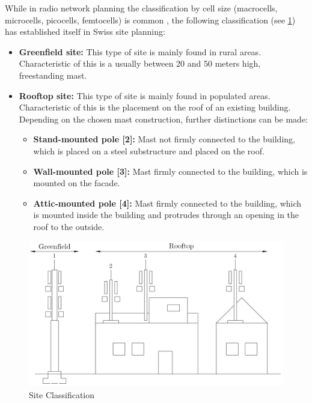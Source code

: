 \begin{English}
    While in radio network planning the classification by cell size (macrocells, microcells, picocells, femtocells) is common \cite{jiangCellularCommunicationNetworks2024}, the following classification (see \ref{fig:site_classification}) has established itself in Swiss site planning:

    \begin{itemize}
        \item \textbf{Greenfield site:} This type of site is mainly found in rural areas. Characteristic of this is a usually between 20 and 50 meters high, freestanding mast.
        \item \textbf{Rooftop site:} This type of site is mainly found in populated areas. Characteristic of this is the placement on the roof of an existing building. Depending on the chosen mast construction, further distinctions can be made:
        \begin{itemize}
            \item \textbf{Stand-mounted pole [2]:} Mast not firmly connected to the building, which is placed on a steel substructure and placed on the roof.
            \item \textbf{Wall-mounted pole [3]:} Mast firmly connected to the building, which is mounted on the facade.
            \item \textbf{Attic-mounted pole [4]:} Mast firmly connected to the building, which is mounted inside the building and protrudes through an opening in the roof to the outside.
        \end{itemize}
    \end{itemize}
\end{English}

\begin{figure}[h]
    \centering
    \includegraphics[width=1\textwidth]{dwg/site_classification.PNG}
    \caption{Site Classification}
    \label{fig:site_classification}
\end{figure}


